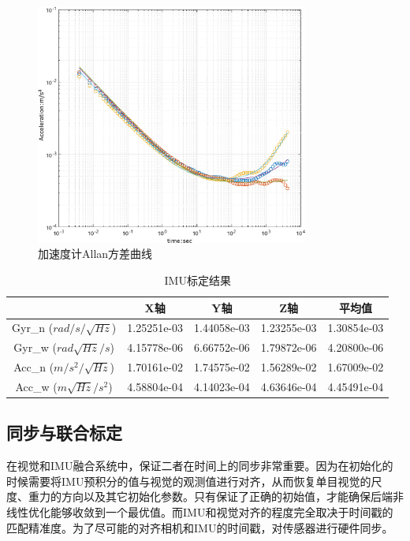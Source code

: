 \begin{figure}[!h]\setlength{\belowcaptionskip}{-12pt}
	\centering
	\includegraphics[width=0.8\textwidth]{figures/chapter2/fig2_14_change2}
	\caption{加速度计Allan方差曲线}\label{fig2_14}
\end{figure}
\begin{table}[h]\setlength{\abovecaptionskip}{6pt}
	\centering
	\caption{IMU标定结果} \label{tab2.5}
	\begin{tabular*}{0.9\textwidth}{@{\extracolsep{\fill}}ccccc}
		\toprule
					&X轴		&Y轴	  &Z轴	&平均值 \\
		\midrule
		Gyr\_n ($rad/s/\sqrt{Hz}$)	&1.25251e-03	&1.44058e-03	&1.23255e-03	&1.30854e-03\\
		Gyr\_w ($rad\sqrt{Hz}/s$)	&4.15778e-06	&6.66752e-06	&1.79872e-06	&4.20800e-06\\
		Acc\_n ($m/s^2/\sqrt{Hz}$)	&1.70161e-02	&1.74575e-02	&1.56289e-02	&1.67009e-02\\
		Acc\_w ($m\sqrt{Hz}/s^2$)	&4.58804e-04	&4.14023e-04	&4.63646e-04	&4.45491e-04\\		
		\bottomrule
	\end{tabular*}
\end{table}
\subsection{同步与联合标定}
在视觉和IMU融合系统中，保证二者在时间上的同步非常重要。因为在初始化的时候需要将IMU预积分的值与视觉的观测值进行对齐，从而恢复单目视觉的尺度、重力的方向以及其它初始化参数。只有保证了正确的初始值，才能确保后端非线性优化能够收敛到一个最优值。而IMU和视觉对齐的程度完全取决于时间戳的匹配精准度。为了尽可能的对齐相机和IMU的时间戳，对传感器进行硬件同步。

